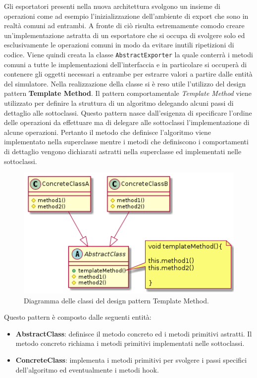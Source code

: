 \documentclass[12pt,a4paper,openright,oneside]{book}
\begin{document}
Gli esportatori presenti nella nuova architettura svolgono un insieme di operazioni come ad esempio l'inizializzazione dell'ambiente di export che sono in realtà comuni ad entrambi.
A fronte di ciò risulta estremamente comodo creare un'implementazione astratta di un esportatore che si occupa di svolgere solo ed esclusivamente le operazioni comuni in modo da evitare inutili ripetizioni di codice.
Viene quindi creata la classe \texttt{AbstractExporter} la quale conterrà i metodi comuni a tutte le implementazioni dell'interfaccia e in particolare si occuperà di contenere gli oggetti necessari a entrambe per estrarre valori a partire dalle entità del simulatore.
Nella realizzazione della classe si è reso utile l'utilizzo del design pattern \textbf{Template Method}.
Il pattern comportamentale \textit{Template Method} viene utilizzato per definire la struttura di un algoritmo delegando alcuni passi di dettaglio alle sottoclassi.
Questo pattern nasce dall’esigenza di specificare l’ordine delle operazioni da effettuare ma di delegare alle sottoclassi l’implementazione di alcune operazioni. Pertanto il metodo che definisce l’algoritmo viene implementato nella superclasse mentre i metodi che definiscono i comportamenti di dettaglio vengono dichiarati astratti nella superclasse ed implementati nelle sottoclassi.
\begin{figure}
	\centering
	\includegraphics[width=1\linewidth]{images/template_method.png}
	\caption{Diagramma delle classi del design pattern Template Method.}
	\label{fig:uml-template_method}
\end{figure}
Questo pattern è composto dalle seguenti entità:
\begin{itemize}
    \item \textbf{AbstractClass}: definisce il metodo concreto ed i metodi primitivi astratti. Il metodo concreto richiama i metodi primitivi implementati nelle sottoclassi.
    \item \textbf{ConcreteClass}: implementa i metodi primitivi per svolgere i passi specifici dell’algoritmo ed eventualmente i metodi hook.
\end{itemize}
\end{document}
